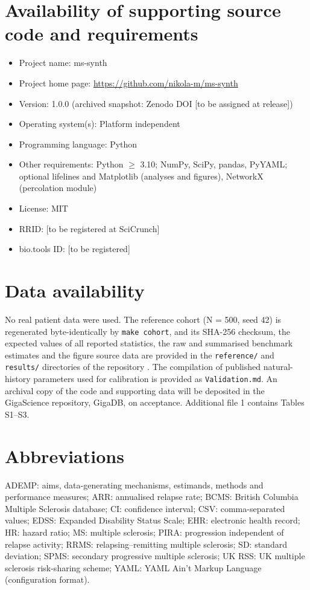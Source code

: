 \documentclass[11pt,a4paper]{article}
\newcommand{\soft}[1]{\texttt{#1}}
\begin{document}
\section*{Availability of supporting source code and requirements}
\begin{itemize}[leftmargin=*,itemsep=0pt]
\item Project name: ms-synth
\item Project home page: \url{https://github.com/nikola-m/ms-synth}
\item Version: 1.0.0 (archived snapshot: Zenodo DOI [to be assigned at release])
\item Operating system(s): Platform independent
\item Programming language: Python
\item Other requirements: Python $\geq$ 3.10; NumPy, SciPy, pandas, PyYAML; optional lifelines and Matplotlib (analyses and figures), NetworkX (percolation module)
\item License: MIT
\item RRID: [to be registered at SciCrunch]
\item bio.tools ID: [to be registered]
\end{itemize}

\section*{Data availability}
No real patient data were used. The reference cohort (N = 500, seed 42) is regenerated byte-identically by \soft{make cohort}, and its SHA-256 checksum, the expected values of all reported statistics, the raw and summarised benchmark estimates and the figure source data are provided in the \soft{reference/} and \soft{results/} directories of the repository \cite{mssynth}. The compilation of published natural-history parameters used for calibration is provided as \soft{Validation.md}. An archival copy of the code and supporting data will be deposited in the GigaScience repository, GigaDB, on acceptance. Additional file 1 contains Tables S1--S3.

\section*{Abbreviations}
ADEMP: aims, data-generating mechanisms, estimands, methods and performance measures; ARR: annualised relapse rate; BCMS: British Columbia Multiple Sclerosis database; CI: confidence interval; CSV: comma-separated values; EDSS: Expanded Disability Status Scale; EHR: electronic health record; HR: hazard ratio; MS: multiple sclerosis; PIRA: progression independent of relapse activity; RRMS: relapsing--remitting multiple sclerosis; SD: standard deviation; SPMS: secondary progressive multiple sclerosis; UK RSS: UK multiple sclerosis risk-sharing scheme; YAML: YAML Ain't Markup Language (configuration format).
\end{document}
